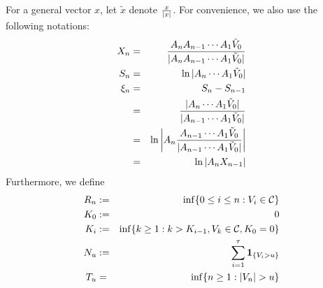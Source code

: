 \documentclass[aoas,preprint]{imsart}
\numberwithin{equation}{section}
\theoremstyle{plain}
\begin{document}
For a general vector $x$, let $\tilde x$ denote ${x \over |x|}$. For
convenience, we also use the following notations:
\begin{eqnarray*}
X_n &=& {
        A_n A_{n-1} \cdots A_1 \tilde V_0
        \over
        |A_n A_{n-1} \cdots A_1 \tilde V_0|
        } \\
S_n &=& \ln |A_n \cdots A_1 \tilde V_0| \\
\xi_n &=& S_n - S_{n-1} \\
&=& \frac{|A_n \cdots A_1 \tilde V_0|}{|A_{n-1} \cdots A_1 \tilde V_0|} \\
&=& \ln\left| A_n \frac{A_{n-1} \cdots A_1 \tilde V_0}
    {|A_{n-1} \cdots A_1 \tilde V_0|} \right|\\
&=& \ln |A_n X_{n-1}|
\end{eqnarray*}
Furthermore, we define
\begin{eqnarray*}
R_n &:=& \inf\{0 \leq i \leq n: V_i \in \mathcal C\} \\
K_0 &:=& 0 \\
K_i &:=& \inf\{k \geq 1: k > K_{i-1}, V_k \in \mathcal C, K_0 = 0\} \\
N_u &:=& \sum_{i=1}^\tau \mathbf{1}_{\{V_i > u\}} \\
T_u &=& \inf\{n \geq 1: |V_n| > u\}
\end{eqnarray*}

  
\end{document}
